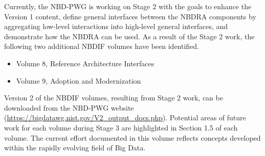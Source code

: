 Currently, the NBD-PWG is working on Stage 2 with the goals to enhance the Version 1 content, define general interfaces between the NBDRA components by aggregating low-level interactions into high-level general interfaces, and demonstrate how the NBDRA can be used. As a result of the Stage 2 work, the following two additional NBDIF volumes have been identified.

\begin{itemize}
\item	Volume 8, Reference Architecture Interfaces

\item	Volume 9, Adoption and Modernization
\end{itemize}

Version 2 of the NBDIF volumes, resulting from Stage 2 work, can be downloaded from the NBD-PWG website (\url{https://bigdatawg.nist.gov/V2_output_docs.php}). Potential areas of future work for each volume during Stage 3 are highlighted in Section 1.5 of each volume. The current effort documented in this volume reflects concepts developed within the rapidly evolving field of Big Data.




